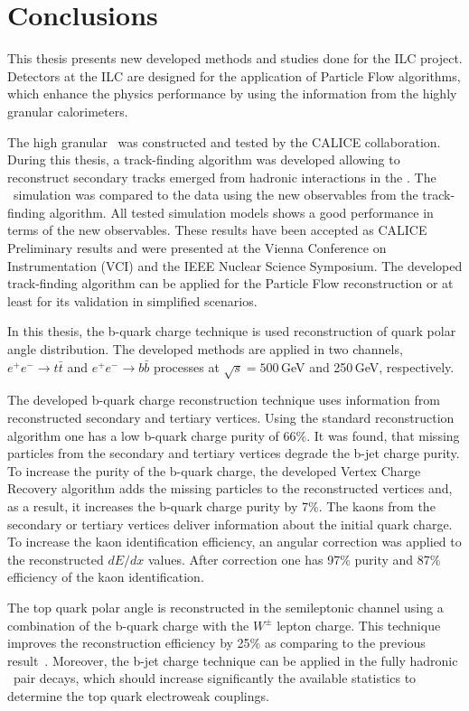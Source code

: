 \section*{Conclusions}
This thesis presents new developed methods and studies done for the ILC project.
Detectors at the ILC are designed for the application of Particle Flow algorithms, which enhance the physics performance by using the information from the highly granular calorimeters. 

The high granular \ecalp\ was constructed and tested by the CALICE collaboration. 
During this thesis, a track-finding algorithm was developed allowing to reconstruct secondary tracks emerged from hadronic interactions in the \ecalp.
The \ecalp\ simulation was compared to the data using the new observables from the track-finding algorithm. 
All tested simulation models shows a good performance in terms of the new observables. 
These results have been accepted as CALICE Preliminary results and were presented at the Vienna Conference on Instrumentation (VCI) and the IEEE Nuclear Science Symposium.
The developed track-finding algorithm can be applied for the Particle Flow reconstruction or at least for its validation in simplified scenarios.

In this thesis, the b-quark charge technique is used reconstruction of quark polar angle distribution.
The developed methods are applied in two channels, $e^+e^-\to t\bar{t}$ and $e^+e^-\to b\bar{b}$ processes at $\sqrt{s} = 500$\,GeV and 250\,GeV, respectively.

The developed b-quark charge reconstruction technique uses information from reconstructed secondary and tertiary vertices. 
Using the standard reconstruction algorithm one has a low b-quark charge purity of 66\%.
It was found, that missing particles from the secondary and tertiary vertices degrade the b-jet charge purity. 
To increase the purity of the b-quark charge, the developed Vertex Charge Recovery algorithm adds the missing particles to the reconstructed vertices and, as a result, it increases the b-quark charge purity by 7\%.
The kaons from the secondary or tertiary vertices deliver information about the initial quark charge. 
To increase the kaon identification efficiency, an angular correction was applied to the reconstructed $dE/dx$ values. 
After correction one has 97\% purity and 87\% efficiency of the kaon identification.

The top quark polar angle is reconstructed in the semileptonic channel using a combination of the b-quark charge with the $W^\pm$ lepton charge. 
This technique improves the reconstruction efficiency by 25\% as comparing to the previous result~\cite{bib:ILCTOP}.
Moreover, the b-jet charge technique can be applied in the fully hadronic \ttbar\ pair decays, which should increase significantly the available statistics to determine the top quark electroweak couplings. 

